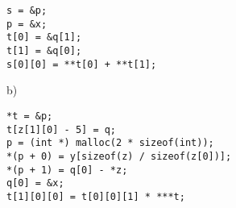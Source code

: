 \documentclass[a4paper,12pt]{article}
\begin{document}
\begin{lstlisting}
s = &p;
p = &x;
t[0] = &q[1];
t[1] = &q[0];
s[0][0] = **t[0] + **t[1];
\end{lstlisting}


b)

\begin{lstlisting}
*t = &p;
t[z[1][0] - 5] = q;
p = (int *) malloc(2 * sizeof(int));
*(p + 0) = y[sizeof(z) / sizeof(z[0])];
*(p + 1) = q[0] - *z;
q[0] = &x;
t[1][0][0] = t[0][0][1] * ***t;
\end{lstlisting}
\end{document}
